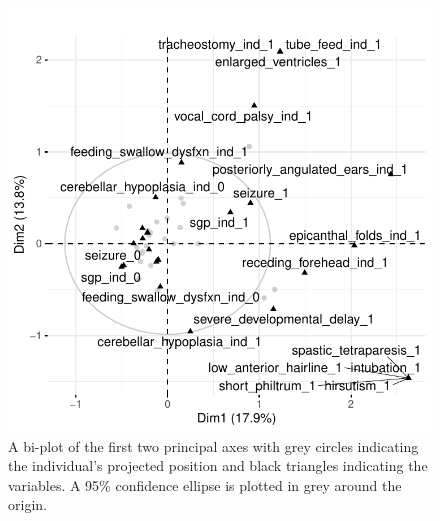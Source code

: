 \documentclass[
  authoryear,
  preprint,
  3p]{elsarticle}
\begin{document}
\begin{figure}

{\centering \includegraphics{paper_files/figure-pdf/fig-biplot-1.pdf}

}

\caption{\label{fig-biplot}A bi-plot of the first two principal axes
with grey circles indicating the individual's projected position and
black triangles indicating the variables. A 95\% confidence ellipse is
plotted in grey around the origin.}

\end{figure}
\end{document}
